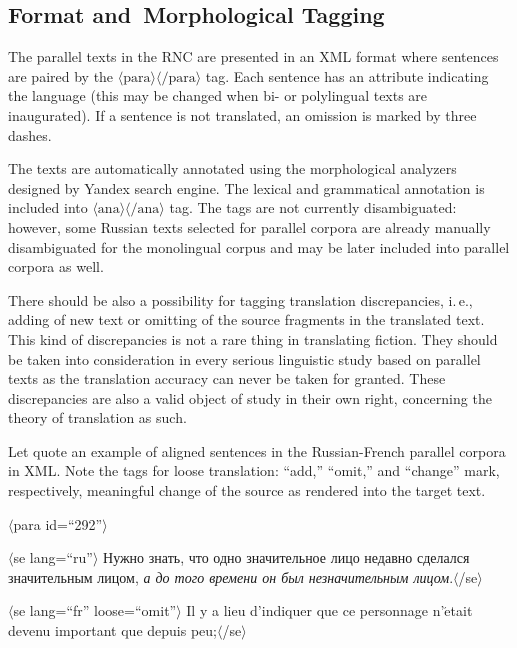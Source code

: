 \begin{multicols}{2}
\section{Format and~Morphological Tagging}

\noindent
     The parallel texts in the RNC are presented in an XML format where sentences are paired by 
the $\langle\mathrm{para}\rangle\langle/\mathrm{para}\rangle$ tag. Each sentence has an attribute 
indicating the language (this may be changed when bi- or polylingual texts are inaugurated). If a 
sentence is not translated, an omission is marked by three dashes.
     
   The texts are automatically annotated using the morphological analyzers designed by Yandex 
search engine. The lexical and grammatical annotation is included into 
$\langle\mathrm{ana}\rangle\langle/\mathrm{ana}\rangle$ tag. The tags are not currently 
disambiguated: however, some Russian texts selected for parallel corpora are already manually 
disambiguated for the monolingual corpus and may be later included into parallel corpora as well.
     
     There should be also a possibility for tagging translation discrepancies, i.\,e., adding of new text 
or omitting of the source fragments in the translated text. This kind of discrepancies is not a rare 
thing in translating fiction. They should be taken into consideration in every serious linguistic study 
based on parallel texts as the translation accuracy can never be taken for granted. These 
discrepancies are also a valid object of study in their own right, concerning the theory of translation 
as such.
     
     Let quote an example of aligned sentences in the Russian-French parallel corpora in XML. 
Note the tags for loose translation: ``add,'' ``omit,'' and ``change'' mark, respectively, meaningful 
change of the source as rendered into the target text.
     
     
     $\langle$para id\;=\;``292''$\rangle$
     
     \hspace*{2mm}$\langle$se lang\;=\;``ru''$\rangle$ Нужно знать, что одно значительное 
лицо недавно сделался значительным лицом, \textit{а до того времени он был 
незначительным лицом}.$\langle$/se$\rangle$
     
     \hspace*{2mm}$\langle$se lang\;=\;``fr'' loose\;=\;``omit''$\rangle$ Il y a lieu d'indiquer que 
ce personnage n'$\acute{\mbox{e}}$tait devenu important que depuis peu;$\langle$/se$\rangle$
     

\end{multicols}
